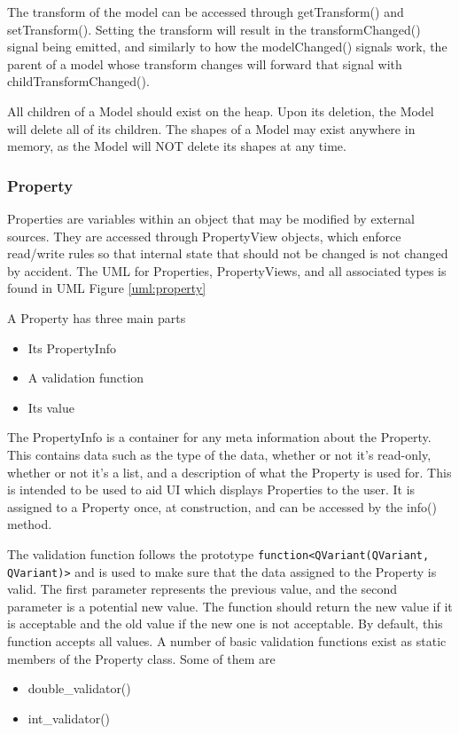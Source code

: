  The transform of the model can be accessed through getTransform() and setTransform(). Setting the transform will result in the transformChanged() signal being emitted, and similarly to how the modelChanged() signals work, the parent of a model whose transform changes will forward that signal with childTransformChanged().
 
 All children of a Model should exist on the heap. Upon its deletion, the Model will delete all of its children. The shapes of a Model may exist anywhere in memory, as the Model will NOT delete its shapes at any time.
 	
 \subsubsection{Property}
 	Properties are variables within an object that may be modified by external sources. They are accessed through PropertyView objects, which enforce read/write rules so that internal state that should not be changed is not changed by accident. The UML for Properties, PropertyViews, and all associated types is found in UML Figure \ref{uml:property}
 	
 	A Property has three main parts
 	\begin{itemize}
 		\item Its PropertyInfo
 		\item A validation function
 		\item Its value
 	\end{itemize}
 	
 	The PropertyInfo is a container for any meta information about the Property. This contains data such as the type of the data, whether or not it's read-only, whether or not it's a list, and a description of what the Property is used for. This is intended to be used to aid UI which displays Properties to the user. It is assigned to a Property once, at construction, and can be accessed by the info() method.
 	
 	The validation function follows the prototype \lstinline|function<QVariant(QVariant, QVariant)>| and is used to make sure that the data assigned to the Property is valid. The first parameter represents the previous value, and the second parameter is a potential new value. The function should return the new value if it is acceptable and the old value if the new one is not acceptable. By default, this function accepts all values. A number of basic validation functions exist as static members of the Property class. Some of them are
 	\begin{itemize}
 		\item double\_validator()
 		\item int\_validator()
 	\end{itemize}
 	
